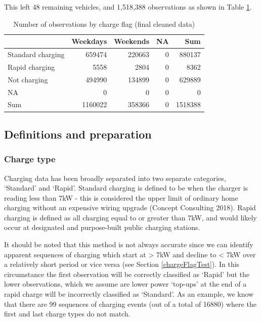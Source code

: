 \documentclass[]{article}
\begin{document}
This left 48 remaining vehicles, and 1,518,388 observations as shown in Table \ref{tab:finalTable}.

\begin{table}[t]

\caption{\label{tab:finalTable}Number of observations by charge flag (final cleaned data)}
\centering
\begin{tabular}{l|r|r|r|r}
\hline
  & Weekdays & Weekends & NA & Sum\\
\hline
Standard charging & 659474 & 220663 & 0 & 880137\\
\hline
Rapid charging & 5558 & 2804 & 0 & 8362\\
\hline
Not charging & 494990 & 134899 & 0 & 629889\\
\hline
NA & 0 & 0 & 0 & 0\\
\hline
Sum & 1160022 & 358366 & 0 & 1518388\\
\hline
\end{tabular}
\end{table}

\hypertarget{definitions}{%
\subsection{Definitions and preparation}\label{definitions}}

\hypertarget{chargeType}{%
\subsubsection{Charge type}\label{chargeType}}

Charging data has been broadly separated into two separate categories, `Standard' and `Rapid'. Standard charging is defined to be when the charger is reading less than 7kW - this is considered the upper limit of ordinary home charging without an expensive wiring upgrade (Concept Consulting 2018). Rapid charging is defined as all charging equal to or greater than 7kW, and would likely occur at designated and purpose-built public charging stations.

It should be noted that this method is not always accurate since we can identify apparent sequences of charging which start at \textgreater{} 7kW and decline to \textless{} 7kW over a relatively short period or vice versa (see Section \ref{chargeFlagTest}). In this circumstance the first observation will be correctly classified as `Rapid' but the lower observations, which we assume are lower power `top-ups' at the end of a rapid charge will be incorrectly classified as `Standard'. As an example, we know that there are 99 sequences of charging events (out of a total of 16880) where the first and last charge types do not match.
\end{document}
